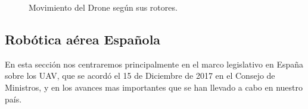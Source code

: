 \begin{figure}[H]
 \centering
 \caption{Movimiento del Drone según sus rotores.}
 \label{f:Moviento en drones.}
\end{figure}

\subsection{Robótica aérea Española}
\hspace{1cm} En esta sección nos centraremos principalmente en el marco legislativo en España sobre los UAV, que se acordó el 15 de Diciembre de 2017 en el Consejo de Ministros, y en los avances mas importantes que se han llevado a cabo en nuestro país. 

